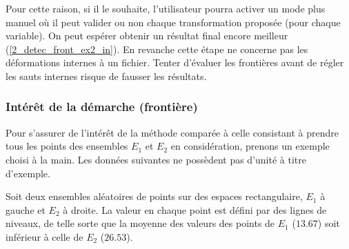 \documentclass[12pt]{article}
\begin{document}
    \label{2_detec_front_ex2_out} Pour cette raison, si il le souhaite, l'utilisateur pourra activer un mode plus manuel où il peut valider ou non chaque transformation proposée (pour chaque variable). On peut espérer obtenir un résultat final encore meilleur (\ref{2_detec_front_ex2_in}). En revanche cette étape ne concerne pas les déformations internes à un fichier. Tenter d'évaluer les frontières avant de régler les sauts internes risque de fausser les résultats.

\newpage
\subsubsection{Intérêt de la démarche (frontière)}

    Pour s'assurer de l'intérêt de la méthode comparée à celle consistant à prendre tous les points des ensembles $E_1$ et $E_2$ en considération, prenons un exemple choisi à la main. Les données suivantes ne possèdent pas d'unité à titre d'exemple.

    Soit deux ensembles aléatoires de points sur des espaces rectangulaire, $E_1$ à gauche et $E_2$ à droite. La valeur en chaque point est défini par des lignes de niveaux, de telle sorte que la moyenne des valeurs des points de $E_1$ ($13.67$) soit inférieur à celle de $E_2$ ($26.53$).
\end{document}
